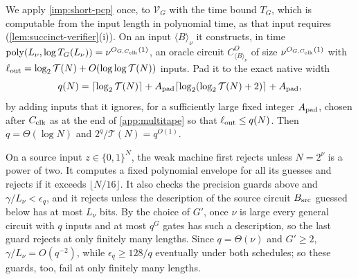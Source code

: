 \documentclass[11pt,letterpaper]{article}
\theoremstyle{definition}
\theoremstyle{remark}
\newcommand{\poly}{\operatorname{poly}}
\newcommand{\lgx}{\log_2}
\newcommand{\Tclk}{\mathcal T}
\begin{document}
We apply \cref{imp:short-pcp} once, to $\mathcal V_G$ with the time bound
$T_G$, which is computable from the input length in polynomial time, as
that input requires (\cref{lem:succinct-verifier}(i)). On an input $\langle B\rangle_\nu$ it constructs, in time
$\poly(L_\nu,\log T_G(L_\nu))=\nu^{O_{G,C_{\rm clk}}(1)}$, an oracle circuit
$C^O_{\langle B\rangle_\nu}$ of size $\nu^{O_{G,C_{\rm clk}}(1)}$ with
$\ell_{\rm out}=\lgx\Tclk(N)+O(\log\log\Tclk(N))$ inputs. Pad it to the
exact native width
\[
 q(N)=\lceil\log_2\Tclk(N)\rceil+
 A_{\rm pad}\lceil\log_2(\log_2\Tclk(N)+2)\rceil+A_{\rm pad},
\]
by adding inputs that it ignores, for a sufficiently large fixed integer
$A_{\rm pad}$, chosen after $C_{\rm clk}$ as at the end of
\cref{app:multitape} so that $\ell_{\rm out}\le q(N)$. Then
$q=\Theta(\log N)$ and $2^q/\Tclk(N)=q^{O(1)}$.

On a source input $z\in\{0,1\}^N$, the weak machine first rejects
unless $N=2^\nu$ is a power of two. It computes a
fixed polynomial envelope for all its guesses and rejects if it
exceeds $\lfloor N/16\rfloor$. It also checks the precision guards
above and $\gamma/L_\nu<\epsilon_q$, and it rejects unless the
description of the source circuit $B_{\rm src}$ guessed below has at
most $L_\nu$ bits. By the choice of $G'$, once $\nu$ is large every
general circuit with $q$ inputs and at most $q^G$ gates has such a
description, so the last guard rejects at only finitely many lengths.
Since $q=\Theta(\nu)$ and
$G'\ge2$, $\gamma/L_\nu=O(q^{-2})$, while $\epsilon_q\ge128/q$
eventually under both schedules; so these guards, too, fail at only
finitely many lengths.
\end{document}
